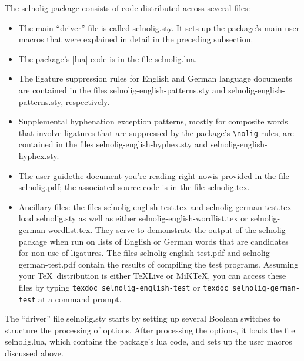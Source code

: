 \documentclass[11pt]{article}
\newcommand{\pkg}[1]{\textsf{#1}}
\newcommand{\cmmd}[1]{\texttt{\textbackslash #1}}
\begin{document}
The \pkg{selnolig} package consists of code distributed across several files:
\begin{itemize}
\item The main \enquote{driver} file is called \pkg{selnolig.sty}. It sets up the package's main user macros that were explained in detail in the preceding subsection. 
\item The package's |lua| code is in the file \pkg{selnolig.lua}. 
\item The ligature suppression rules for English and German language documents are contained in the files \pkg{selnolig-english-patterns.sty} and \pkg{selnolig-english-patterns.sty}, respectively.
\item Supplemental hyphenation exception patterns, mostly for composite words that involve ligatures that are  suppressed by the package's \cmmd{nolig} rules, are contained in the files \pkg{selnolig-english-hyphex.sty} and \pkg{selnolig-english-hyphex.sty}.
\item The user guide\textemdash the document you're reading right now\textemdash is provided in the file \pkg{selnolig.pdf}; the associated source code is in the file \pkg{selnolig.tex}. 
\item Ancillary files: the files \pkg{selnolig-english-test.tex} and \pkg{selnolig-german-test.tex} load  \pkg{selnolig.sty} as well as either \pkg{selnolig-english-wordlist.tex} or \pkg{selnolig-german-wordlist.tex}. They serve to demonstrate the output of the \pkg{selnolig} package when run on lists of English or German words that are candidates for non-use of ligatures. The files \pkg{selnolig-english-test.pdf} and \pkg{selnolig-german-test.pdf} contain the results of compiling the test programs. 
Assuming your \TeX\ distribution is either \TeX Live or MiK\TeX, you can access these files by typing \Verb+texdoc selnolig-english-test+ or \Verb+texdoc selnolig-german-test+ at a command prompt. 
\end{itemize}

The \enquote{driver} file \pkg{selnolig.sty} starts by setting up several Boolean switches to structure the processing of options. After processing the options, it loads the file \pkg{selnolig.lua}, which contains the package's lua code, and sets up the user macros discussed above. 
\end{document}
